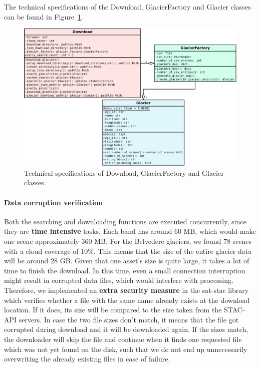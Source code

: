\documentclass[12pt, a4paper]{report}
\begin{document}
	\par The technical specifications of the Download, GlacierFactory and Glacier classes can be found in Figure~\ref{fig:sd_diagram}.
	
	\begin{figure}[h]
		\centering
		\includegraphics[scale=0.23]{../images/sd_diagram.png}
		\caption{Technical specifications of Download, GlacierFactory and Glacier classes.}
		\label{fig:sd_diagram}
	\end{figure}

	\paragraph{Data corruption verification}
	Both the searching and downloading functions are executed concurrently, since they are \textbf{time intensive} tasks. Each band has around 60 MB, which would make one scene approximately 360 MB. For the Belvedere glaciers, we found 78 scenes with a cloud coverage of 10\%. This means that the size of the entire glacier data will be around 28 GB. Given that one asset's size is quite large, it takes a lot of time to finish the download. In this time, even a small connection interruption might result in corrupted data files, which would interfere with processing. Therefore, we implemented an \textbf{extra security measure} in the sat-stac library which verifies whether a file with the same name already exists at the download location. If it does, its size will be compared to the size taken from the STAC-API servers. In case the two file sizes don't match, it means that the file got corrupted during download and it will be downloaded again. If the sizes match, the downloader will skip the file and continue when it finds one requested file which was not yet found on the disk, such that we do not end up unnecessarily overwriting the already existing files in case of failure.
	
\end{document}
